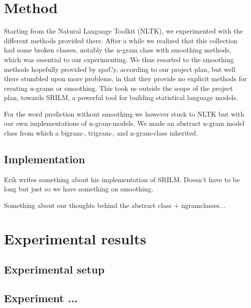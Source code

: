 \documentclass[a4paper,12pt]{article}
\begin{document}
\section{Method}
\label{sec:method}

Starting from the Natural Language Toolkit (NLTK), we experimented with the different methods provided there. After a while we realized that this collection had some broken classes, notably the n-gram class with smoothing methods, which was essential to our experimenting. We thus resorted to the smoothing methods hopefully provided by spaCy, according to our project plan, but well there stumbled upon more problems, in that they provide no explicit methods for creating n-grams or smoothing. This took us outside the scope of the project plan, towards SRILM, a powerful tool for building statistical language models.

For the word prediction without smoothing we however stuck to NLTK but with our own implementations of n-gram-models. We made an abstract n-gram model class from which a bigram-, trigram-, and n-gram-class inherited.

\subsection{Implementation}
\label{sec:impl}

Erik writes something about his implementation of SRILM. Doesn't have to be long but just so we have something on smoothing.

Something about our thoughts behind the abstract class + ngramclasses...

\section{Experimental results}
\label{sec:exps}

\subsection{Experimental setup}

\subsection{Experiment ...}
\end{document}
